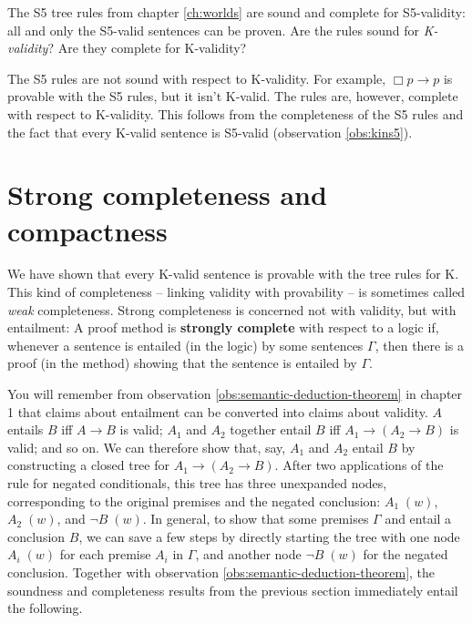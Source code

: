 \begin{exercise}
  The S5 tree rules from chapter \ref{ch:worlds} are sound and complete for
  S5-validity: all and only the S5-valid sentences can be proven. Are the rules
  sound for \emph{K-validity}? Are they complete for K-validity?
\end{exercise}
\begin{solution}
  The S5 rules are not sound with respect to K-validity. For example,
  $\Box p \to p$ is provable with the S5 rules, but it isn't K-valid. The rules
  are, however, complete with respect to K-validity. This follows from the
  completeness of the S5 rules and the fact that every K-valid sentence is
  S5-valid (observation \ref{obs:kins5}).
\end{solution}

\iffalse
\section{Strong completeness and compactness}%
\label{sec:compactness}


We have shown that every K-valid sentence is provable with the tree rules for K.
This kind of completeness -- linking validity with provability -- is sometimes
called \emph{weak} completeness. Strong completeness is concerned not with
validity, but with entailment: A proof method is \textbf{strongly complete} with
respect to a logic if, whenever a sentence is entailed (in the logic) by some
sentences $\Gamma$, then there is a proof (in the method) showing that the
sentence is entailed by $\Gamma$.

You will remember from observation \ref{obs:semantic-deduction-theorem} in
chapter 1 that claims about entailment can be converted into claims about
validity. $A$ entails $B$ iff $A \to B$ is valid; $A_{1}$ and $A_{2}$ together
entail $B$ iff $A_{1} \to (A_{2} \to B)$ is valid; and so on. We can therefore
show that, say, $A_{1}$ and $A_{2}$ entail $B$ by constructing a closed tree for
$A_{1} \to (A_{2} \to B)$. After two applications of the rule for negated
conditionals, this tree has three unexpanded nodes, corresponding to the
original premises and the negated conclusion: $A_{1}\; (w)$, $A_{2}\; (w)$, and
$\neg B\; (w)$. In general, to show that some premises $\Gamma$ and entail a
conclusion $B$, we can save a few steps by directly starting the tree with one
node $A_{i}\; (w)$ for each premise $A_{i}$ in $\Gamma$, and another node
$\neg B\; (w)$ for the negated conclusion. Together with observation
\ref{obs:semantic-deduction-theorem}, the soundness and completeness results
from the previous section immediately entail the following.

